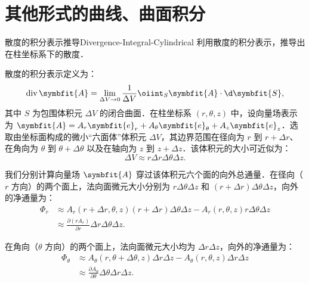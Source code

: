\section{其他形式的曲线、曲面积分}

\begin{problem}{散度的积分表示推导}{Divergence-Integral-Cylindrical}
    利用散度的积分表示，推导出在柱坐标系下的散度．
\end{problem}

\begin{solution}
    散度的积分表示定义为：
    \begin{equation}
        \operatorname{div} \symbfit{A} = \lim_{\Delta V \to 0} \frac{1}{\Delta V} \oiint_{S} \symbfit{A} \cdot \d \symbfit{S},
    \end{equation}
    其中 $S$ 为包围体积元 $\Delta V$ 的闭合曲面．在柱坐标系 $(r, \theta, z)$ 中，设向量场表示为 $\symbfit{A} = A_r \symbfit{e}_r + A_\theta \symbfit{e}_\theta + A_z \symbfit{e}_z$．选取由坐标面构成的微小“六面体”体积元 $\Delta V$，其边界范围在径向为 $r$ 到 $r+\Delta r$、在角向为 $\theta$ 到 $\theta+\Delta \theta$ 以及在轴向为 $z$ 到 $z+\Delta z$．该体积元的大小可近似为：
    \begin{equation}
        \Delta V \approx r \Delta r \Delta \theta \Delta z.
    \end{equation}

    我们分别计算向量场 $\symbfit{A}$ 穿过该体积元六个面的向外总通量．在径向（$r$ 方向）的两个面上，法向面微元大小分别为 $r \Delta \theta \Delta z$ 和 $(r+\Delta r) \Delta \theta \Delta z$，向外的净通量为：
    \begin{equation}
        \begin{aligned}
            \Phi_r & \approx A_r(r+\Delta r, \theta, z) (r+\Delta r) \Delta \theta \Delta z - A_r(r, \theta, z) r \Delta \theta \Delta z \\
                   & \approx \frac{\partial (r A_r)}{\partial r} \Delta r \Delta \theta \Delta z.
        \end{aligned}
    \end{equation}

    在角向（$\theta$ 方向）的两个面上，法向面微元大小均为 $\Delta r \Delta z$，向外的净通量为：
    \begin{equation}
        \begin{aligned}
            \Phi_\theta & \approx A_\theta(r, \theta+\Delta \theta, z) \Delta r \Delta z - A_\theta(r, \theta, z) \Delta r \Delta z \\
                        & \approx \frac{\partial A_\theta}{\partial \theta} \Delta \theta \Delta r \Delta z.
        \end{aligned}
    \end{equation}


\end{solution}
